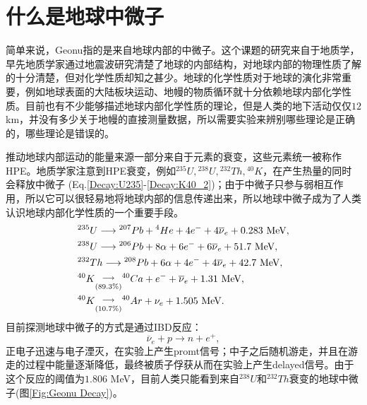 		\section{什么是地球中微子}
			简单来说，Geonu指的是来自地球内部的中微子。这个课题的研究来自于地质学，早先地质学家通过地震波研究清楚了地球的内部结构，对地球内部的物理性质了解的十分清楚，但对化学性质却知之甚少。地球的化学性质对于地球的演化非常重要，例如地球表面的大陆板块运动、地幔的物质循环就十分依赖地球内部化学性质。目前也有不少能够描述地球内部化学性质的理论，但是人类的地下活动仅仅$12$ km，并没有多少关于地幔的直接测量数据，所以需要实验来辨别哪些理论是正确的，哪些理论是错误的。\par
			推动地球内部运动的能量来源一部分来自于元素的衰变，这些元素统一被称作HPE。地质学家注意到HPE衰变，例如${}^{235}U, {}^{238}U, {}^{232}Th, {}^{40}K$，在产生热量的同时会释放中微子\cite{fiorentini2007geo} (Eq.\ref{Decay:U235}-\ref{Decay:K40_2})；由于中微子只参与弱相互作用，所以它可以很轻易地将地球内部的信息传递出来，所以地球中微子成为了人类认识地球内部化学性质的一个重要手段。
				\begin{align}
					&{}^{235}U \longrightarrow {}^{207}Pb + {}^{4}He + 4e^- + 4\overline{\nu}_e + 0.283 \text{ MeV},
					\label{Decay:U235}\\
					&{}^{238}U \longrightarrow {}^{206}Pb + 8\alpha + 6e^- + 6\overline{\nu}_e + 51.7 \text{ MeV},
					\label{Decay:U238}\\
					&{}^{232}Th \longrightarrow {}^{208}Pb + 6\alpha + 4e^- + 4\overline{\nu}_e + 42.7 \text{ MeV},
					\label{Decay:Th232}\\
					&{}^{40}K \overunderset{\longrightarrow}{(89.3\%)} {}^{40}Ca + e^- + \overline{\nu}_e + 1.31 \text{ MeV},
					\label{Decay:K40_1}\\
					&{}^{40}K \overunderset{\longrightarrow}{(10.7\%)} {}^{40}Ar + \nu_e + 1.505 \text{ MeV}.
					\label{Decay:K40_2}
				\end{align}
			目前探测地球中微子的方式是通过IBD反应：
				\begin{equation}
					\overline{\nu}_e + p \longrightarrow n + e^+,
				\end{equation}
			正电子迅速与电子湮灭，在实验上产生promt信号；中子之后随机游走，并且在游走的过程中能量逐渐降低，最终被质子俘获从而在实验上产生delayed信号。由于这个反应的阈值为$1.806$ MeV，目前人类只能看到来自${}^{238}U$和${}^{232}Th$衰变的地球中微子(图\ref{Fig:Geonu Decay})。
